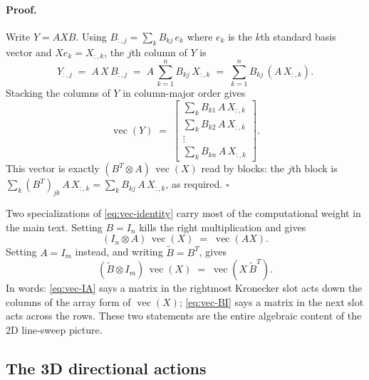 \documentclass[11pt]{article}
\newcommand{\kron}{\otimes}
\newcommand{\vect}{\operatorname{vec}}
\begin{document}
\begin{appendices}
\paragraph{Proof.}
Write $Y = A X B$.  Using $B_{:,j} = \sum_k B_{kj}\,e_k$ where $e_k$
is the $k$th standard basis vector and $X e_k = X_{:,k}$, the $j$th
column of $Y$ is
\begin{equation*}
  Y_{:,j}
  \;=\; A\, X\, B_{:,j}
  \;=\; A\,\sum_{k=1}^{n} B_{kj}\, X_{:,k}
  \;=\; \sum_{k=1}^{n} B_{kj}\,(A\, X_{:,k}).
\end{equation*}
Stacking the columns of $Y$ in column-major order gives
\begin{equation*}
  \vect(Y)
  \;=\;
  \begin{bmatrix}
    \sum_{k} B_{k 1}\, A\, X_{:,k} \\[2pt]
    \sum_{k} B_{k 2}\, A\, X_{:,k} \\[2pt]
    \vdots \\[2pt]
    \sum_{k} B_{k n}\, A\, X_{:,k}
  \end{bmatrix}.
\end{equation*}
This vector is exactly $(B^T \kron A)\,\vect(X)$ read by blocks: the
$j$th block is
$\sum_k (B^T)_{j k}\, A\, X_{:,k} = \sum_k B_{k j}\, A\, X_{:,k}$,
as required.  $\square$

Two specializations of \eqref{eq:vec-identity} carry most of the
computational weight in the main text.  Setting $B = I_n$ kills the
right multiplication and gives
\begin{equation}
\label{eq:vec-IA}
  (I_n \kron A)\,\vect(X) \;=\; \vect(A X).
\end{equation}
Setting $A = I_m$ instead, and writing $\tilde B = B^T$, gives
\begin{equation}
\label{eq:vec-BI}
  (\tilde B \kron I_m)\,\vect(X) \;=\; \vect(X\, \tilde B^T).
\end{equation}
In words: \eqref{eq:vec-IA} says a matrix in the rightmost Kronecker
slot acts down the columns of the array form of $\vect(X)$;
\eqref{eq:vec-BI} says a matrix in the next slot acts across the
rows.  These two statements are the entire algebraic content of the
2D line-sweep picture.

\subsection{The 3D directional actions}
\label{app:vec}


\end{appendices}
\end{document}
